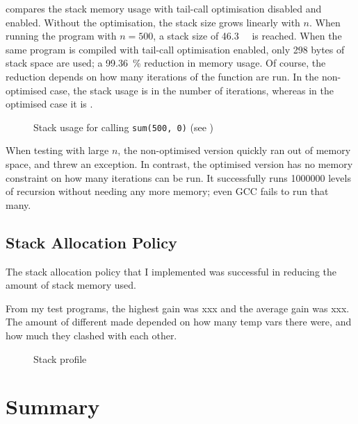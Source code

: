 \documentclass[00-main.tex]{subfiles}
\begin{document}
 compares the stack memory usage with tail-call optimisation disabled and enabled.
Without the optimisation, the stack size grows linearly with $n$.
When running the program with $n=500$, a stack size of \SI{46.3}{\kilo\byte} is reached.
When the same program is compiled with tail-call optimisation enabled, only 298 bytes of stack space are used; a \SI{99.36}{\percent} reduction in memory usage.
Of course, the reduction depends on how many iterations of the function are run.
In the non-optimised case, the stack usage is  in the number of iterations, whereas in the optimised case it is .

\begin{figure}[ht]
  \centering
  \caption{Stack usage for calling \texttt{sum(500, 0)} (see )}
  \label{fig:plot:tail-call optimisation stack use}
\end{figure}

When testing with large $n$, the non-optimised version quickly ran out of memory space, and threw an exception.
In contrast, the optimised version has no memory constraint on how many iterations can be run.
It successfully runs \num{1000000} levels of recursion without needing any more memory; even GCC fails to run that many.


\subsection{Stack Allocation Policy}

The stack allocation policy that I implemented was successful in reducing the amount of stack memory used.

From my test programs, the highest gain was xxx and the average gain was xxx.
The amount of different made depended on how many temp vars there were, and how much they clashed with each other.

\begin{figure}[ht]
  \centering
  \caption{Stack profile}
  \label{fig:}
\end{figure}

\section{Summary}
\end{document}
